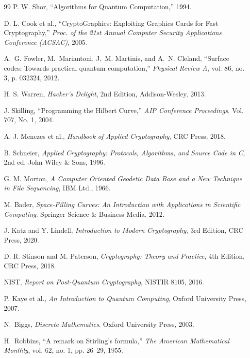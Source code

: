 \documentclass[12pt,fleqn]{article}
\begin{document}
\begin{thebibliography}{99}
P. W. Shor, ``Algorithms for Quantum Computation,'' 1994.

D. L. Cook et al., ``CryptoGraphics: Exploiting Graphics Cards for Fast Cryptography,'' \textit{Proc. of the 21st Annual Computer Security Applications Conference (ACSAC)}, 2005.

A.~G. Fowler, M.~Mariantoni, J.~M. Martinis, and A.~N. Cleland, ``Surface codes: Towards practical quantum computation,'' \textit{Physical Review A}, vol. 86, no. 3, p. 032324, 2012.

H. S. Warren, \textit{Hacker's Delight}, 2nd Edition, Addison-Wesley, 2013.

J. Skilling, ``Programming the Hilbert Curve,'' \textit{AIP Conference Proceedings}, Vol. 707, No. 1, 2004.

A. J. Menezes et al., \textit{Handbook of Applied Cryptography}, CRC Press, 2018.

B. Schneier, \textit{Applied Cryptography: Protocols, Algorithms, and Source Code in C}, 2nd ed. John Wiley \& Sons, 1996.

G. M. Morton, \textit{A Computer Oriented Geodetic Data Base and a New Technique in File Sequencing}, IBM Ltd., 1966.

M. Bader, \textit{Space-Filling Curves: An Introduction with Applications in Scientific Computing}. Springer Science \& Business Media, 2012.

J. Katz and Y. Lindell, \textit{Introduction to Modern Cryptography}, 3rd Edition, CRC Press, 2020.

D. R. Stinson and M. Paterson, \textit{Cryptography: Theory and Practice}, 4th Edition, CRC Press, 2018.

NIST, \textit{Report on Post-Quantum Cryptography}, NISTIR 8105, 2016.

P. Kaye et al., \textit{An Introduction to Quantum Computing}, Oxford University Press, 2007.

N.~Biggs, \textit{Discrete Mathematics}. Oxford University Press, 2003.

H.~Robbins, ``A remark on Stirling's formula,'' \textit{The American Mathematical Monthly}, vol. 62, no. 1, pp. 26--29, 1955.


\end{thebibliography}
\end{document}
